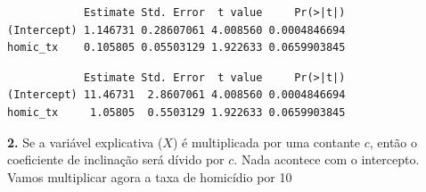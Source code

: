 \documentclass[
  letterpaper,
  DIV=11,
  numbers=noendperiod]{scrreprt}
\newenvironment{Shaded}{\begin{snugshade}}{\end{snugshade}}
\newcommand{\AttributeTok}[1]{\textcolor[rgb]{0.40,0.45,0.13}{#1}}
\newcommand{\DecValTok}[1]{\textcolor[rgb]{0.68,0.00,0.00}{#1}}
\newcommand{\FunctionTok}[1]{\textcolor[rgb]{0.28,0.35,0.67}{#1}}
\newcommand{\NormalTok}[1]{\textcolor[rgb]{0.00,0.23,0.31}{#1}}
\newcommand{\OtherTok}[1]{\textcolor[rgb]{0.00,0.23,0.31}{#1}}
\newcommand{\SpecialCharTok}[1]{\textcolor[rgb]{0.37,0.37,0.37}{#1}}
\begin{document}
\begin{Shaded}
\end{Shaded}

\begin{verbatim}
            Estimate Std. Error  t value     Pr(>|t|)
(Intercept) 1.146731 0.28607061 4.008560 0.0004846694
homic_tx    0.105805 0.05503129 1.922633 0.0659903845
\end{verbatim}

\begin{Shaded}
\end{Shaded}

\begin{verbatim}
            Estimate Std. Error  t value     Pr(>|t|)
(Intercept) 11.46731  2.8607061 4.008560 0.0004846694
homic_tx     1.05805  0.5503129 1.922633 0.0659903845
\end{verbatim}

\textbf{2.} Se a variável explicativa (\(X\)) é multiplicada por uma
contante \(c\), então o coeficiente de inclinação será dívido por \(c\).
Nada acontece com o intercepto. Vamos multiplicar agora a taxa de
homicídio por 10

\begin{Shaded}
\end{Shaded}
\end{document}
